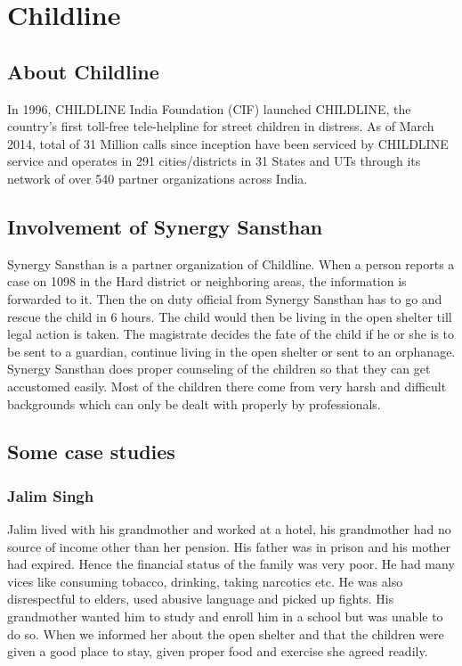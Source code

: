 \chapter{Childline}
\ifpdf
    \graphicspath{{Chapter2/Chapter2Figs/PNG/}{Chapter2/Chapter2Figs/PDF/}{Chapter2/Chapter2Figs/}}
\else
    \graphicspath{{Chapter2/Chapter2Figs/EPS/}{Chapter2/Chapter2Figs/}}
\fi

\section{About Childline}
In 1996, CHILDLINE India Foundation (CIF) launched CHILDLINE, the country's first toll-free tele-helpline for street children in distress. As of March 2014, total of 31 Million calls since inception have been serviced by CHILDLINE service and operates in 291 cities/districts in 31 States and UTs through its network of over 540 partner organizations across India.

\section{Involvement of Synergy Sansthan}
Synergy Sansthan is a partner organization of Childline. When a person reports a case on 1098 in the Hard district or neighboring areas, the information is forwarded to it. Then the on duty official from Synergy Sansthan has to go and rescue the child in 6 hours. The child would then be living in the open shelter till legal action is taken. The magistrate decides the fate of the child if he or she is to be sent to a guardian, continue living in the open shelter or sent to an orphanage. Synergy Sansthan does proper counseling of the children so that they can get accustomed easily. Most of the children there come from very harsh and difficult backgrounds which can only be dealt with properly by professionals.

\section{Some case studies}
\subsection{Jalim Singh}
Jalim lived with his grandmother and worked at a hotel, his grandmother had no source of income other than her pension. His father was in prison and his mother had expired. Hence the financial status of the family was very poor. He had many vices like consuming tobacco, drinking, taking narcotics etc. He was also disrespectful to elders, used abusive language and picked up fights. His grandmother wanted him to study and enroll him in a school but was unable to do so. When we informed her about the open shelter and that the children were given a good place to stay, given proper food and exercise she agreed readily.

